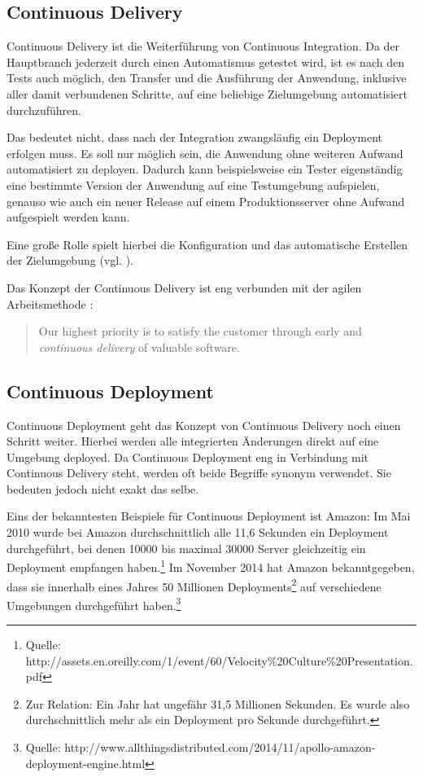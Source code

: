\subsection{Continuous Delivery}

Continuous Delivery ist die Weiterführung von Continuous Integration. Da der Hauptbranch jederzeit durch einen Automatismus getestet wird, ist es nach den Tests auch möglich, den Transfer und die Ausführung der Anwendung, inklusive aller damit verbundenen Schritte, auf eine beliebige Zielumgebung automatisiert durchzuführen.

Das bedeutet nicht, dass nach der Integration zwangsläufig ein Deployment erfolgen muss. Es soll nur möglich sein, die Anwendung ohne weiteren Aufwand automatisiert zu deployen. Dadurch kann beispielsweise ein Tester eigenständig eine bestimmte Version der Anwendung auf eine Testumgebung aufspielen, genauso wie auch ein neuer Release auf einem Produktionsserver ohne Aufwand aufgespielt werden kann. \citep{FowlerCD}

Eine große Rolle spielt hierbei die Konfiguration und das automatische Erstellen der Zielumgebung (vgl. ).

Das Konzept der Continuous Delivery ist eng verbunden mit der agilen Arbeitsmethode \citep{AgileManifesto}:

\begin{quote}
  Our highest priority is to satisfy the customer through early and \emph{continuous delivery} of valuable software.
\end{quote}

\subsection{Continuous Deployment}

Continuous Deployment geht das Konzept von Continuous Delivery noch einen Schritt weiter. Hierbei werden alle integrierten Änderungen direkt auf eine Umgebung deployed. Da Continuous Deployment eng in Verbindung mit Continuous Delivery steht, werden oft beide Begriffe synonym verwendet. Sie bedeuten jedoch nicht exakt das selbe. \citep{FowlerCD}

Eins der bekanntesten Beispiele für Continuous Deployment ist Amazon: Im Mai 2010 wurde bei Amazon durchschnittlich alle 11,6 Sekunden ein Deployment durchgeführt, bei denen 10000 bis maximal 30000 Server gleichzeitig ein Deployment empfangen haben.\footnote{Quelle: http://assets.en.oreilly.com/1/event/60/Velocity\%20Culture\%20Presentation.pdf} Im November 2014 hat Amazon bekanntgegeben, dass sie innerhalb eines Jahres 50 Millionen Deployments\footnote{Zur Relation: Ein Jahr hat ungefähr 31,5 Millionen Sekunden. Es wurde also durchschnittlich mehr als ein Deployment pro Sekunde durchgeführt.} auf verschiedene Umgebungen durchgeführt haben.\footnote{Quelle: http://www.allthingsdistributed.com/2014/11/apollo-amazon-deployment-engine.html}

